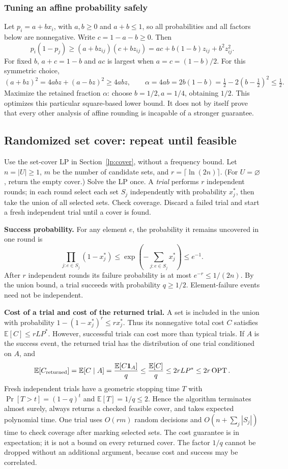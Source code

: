 \documentclass[10pt]{article}
\theoremstyle{definition}
\newcommand{\OPT}{\operatorname{OPT}}
\begin{document}
\subsubsection*{Tuning an affine probability safely}
Let $p_i=a+bx_i$, with $a,b\ge0$ and $a+b\le1$, so all probabilities and
all factors below are nonnegative. Write $c=1-a-b\ge0$. Then
\[
  p_i(1-p_j)\ge(a+bz_{ij})(c+bz_{ij})
    =ac+b(1-b)z_{ij}+b^2z_{ij}^2.
\]
For fixed $b$, $a+c=1-b$ and $ac$ is largest when
$a=c=(1-b)/2$. For this symmetric choice,
\[
  (a+bz)^2=4abz+(a-bz)^2\ge4abz,
  \qquad
  \alpha=4ab=2b(1-b)=\tfrac12-2(b-\tfrac12)^2\le\tfrac12.
\]
Maximize the retained fraction $\alpha$: choose $b=1/2,a=1/4$, obtaining
$1/2$. This optimizes this particular square-based lower bound. It does
not by itself prove that every other analysis of affine rounding is
incapable of a stronger guarantee.

\subsection{Randomized set cover: repeat until feasible}\label{lp:random-cover}
Use the set-cover LP in Section~\ref{lp:cover}, without a frequency bound.
Let $n=|U|\ge1$, $m$ be the number of candidate sets, and
$r=\lceil\ln(2n)\rceil$. (For $U=\varnothing$, return the empty cover.)
Solve the LP once. A \emph{trial} performs $r$ independent rounds; in each
round select each set $S_j$ independently with probability $x_j^*$, then
take the union of all selected sets. Check coverage. Discard a failed trial
and start a fresh independent trial until a cover is found.

\textbf{Success probability.}
For any element $e$, the probability it remains uncovered in one round is
\[
  \prod_{j:e\in S_j}(1-x_j^*)
    \le\exp\left(-\sum_{j:e\in S_j}x_j^*\right)\le e^{-1}.
\]
After $r$ independent rounds its failure probability is at most
$e^{-r}\le1/(2n)$. By the union bound, a trial succeeds with probability
$q\ge1/2$. Element-failure events need not be independent.

\textbf{Cost of a trial and cost of the returned trial.}
A set is included in the union with probability
$1-(1-x_j^*)^r\le r x_j^*$. Thus its nonnegative total cost $C$ satisfies
$\mathbb E[C]\le rLP^*$. However, successful trials can cost more than
typical trials. If $A$ is the success event, the returned trial has the
distribution of one trial conditioned on $A$, and
\[
  \mathbb E[C_{\rm returned}]
    =\mathbb E[C\mid A]
    =\frac{\mathbb E[C\mathbf 1_A]}q
    \le\frac{\mathbb E[C]}q
    \le2rLP^*\le2r\OPT.
\]
Fresh independent trials have a geometric stopping time $T$ with
$\Pr[T>t]=(1-q)^t$ and $\mathbb E[T]=1/q\le2$. Hence the algorithm
terminates almost surely, always returns a checked feasible cover, and
takes expected polynomial time. One trial uses $O(rm)$ random decisions
and $O(n+\sum_j|S_j|)$ time to check coverage after marking selected sets.
The cost guarantee is in expectation; it is not a bound on every returned
cover. The factor $1/q$ cannot be dropped without an additional argument,
because cost and success may be correlated.
\end{document}
